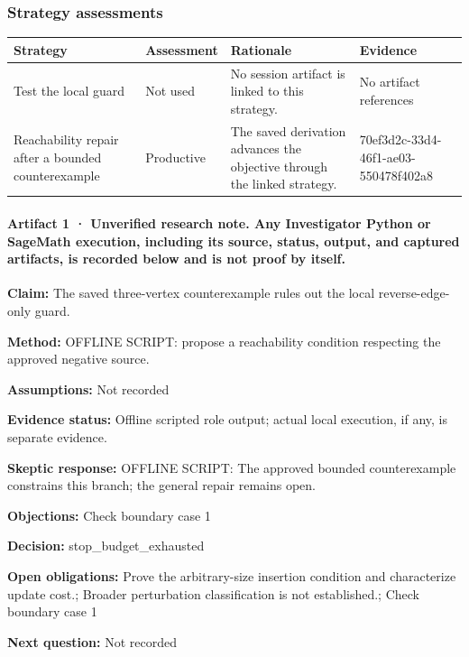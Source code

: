 \documentclass[11pt]{article}
\begin{document}
\subsubsection*{Strategy assessments}
\begin{longtable}{>{\raggedright\arraybackslash}p{.16\linewidth}>{\raggedright\arraybackslash}p{.15\linewidth}>{\raggedright\arraybackslash}p{.40\linewidth}>{\raggedright\arraybackslash}p{.17\linewidth}}
\toprule Strategy & Assessment & Rationale & Evidence \\
\midrule\endhead
Test the local guard & Not used & No session artifact is linked to this strategy. & No artifact references \\
Reachability repair after a bounded counterexample & Productive & The saved derivation advances the objective through the linked strategy. & 70ef3d2c-33d4-46f1-ae03-550478f402a8 \\
\bottomrule
\end{longtable}
\paragraph{Artifact 1 · Unverified research note. Any Investigator Python or SageMath execution, including its source, status, output, and captured artifacts, is recorded below and is not proof by itself.}
\textbf{Claim:} The saved three-vertex counterexample rules out the local reverse-edge-only guard.\par
\textbf{Method:} OFFLINE SCRIPT: propose a reachability condition respecting the approved negative source.\par
\textbf{Assumptions:} Not recorded\par
\textbf{Evidence status:} Offline scripted role output; actual local execution, if any, is separate evidence.\par
\textbf{Skeptic response:} OFFLINE SCRIPT: The approved bounded counterexample constrains this branch; the general repair remains open.\par
\textbf{Objections:} Check boundary case 1\par
\textbf{Decision:} stop\_budget\_exhausted\par
\textbf{Open obligations:} Prove the arbitrary-size insertion condition and characterize update cost.; Broader perturbation classification is not established.; Check boundary case 1\par
\textbf{Next question:} Not recorded\par
\end{document}
